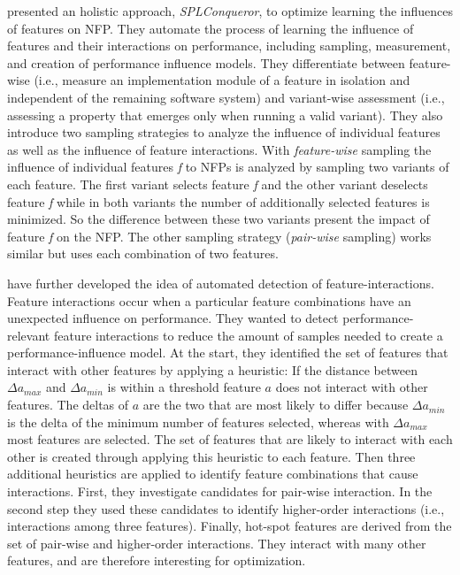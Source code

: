 \cite{siegmund2012spl} presented an holistic approach, \textit{SPLConqueror}, to optimize learning the influences of features on \ac{NFP}. They automate the process of learning the influence of features and their interactions on performance, including sampling, measurement, and creation of performance influence models. They differentiate between feature-wise (i.e., measure an implementation module of a feature in isolation and independent of the remaining software system) and variant-wise assessment (i.e., assessing a property that emerges only when running a valid variant). They also introduce two sampling strategies to analyze the influence of individual features as well as the influence of feature interactions. With \textit{feature-wise} sampling the influence of individual features \textit{f} to \acp{NFP} is analyzed by sampling two variants of each feature. The first variant selects feature \textit{f} and the other variant deselects feature \textit{f} while in both variants the number of additionally selected features is minimized. So the difference between these two variants present the impact of feature \textit{f} on the \ac{NFP}. The other sampling strategy (\textit{pair-wise} sampling) works similar but uses each combination of two features.

\cite{siegmund2012predicting} have further developed the idea of automated detection of feature-interactions. Feature interactions occur when a particular feature combinations have an unexpected influence on performance. They wanted to detect performance-relevant feature interactions to reduce the amount of samples needed to create a performance-influence model. At the start, they identified the set of features that interact with other features by applying a heuristic: If the distance between $\Delta a_{max}$ and $\Delta a_{min}$ is within a threshold feature $a$ does not interact with other features. The deltas of $a$ are the two that are most likely to differ because $\Delta a_{min}$ is the delta of the minimum number of features selected, whereas with $\Delta a_{max}$ most features are selected. The set of features that are likely to interact with each other is created through applying this heuristic to each feature. Then three additional heuristics are applied to identify feature combinations that cause interactions. First, they investigate candidates for pair-wise interaction. In the second step they used these candidates to identify higher-order interactions (i.e., interactions among three features). Finally, hot-spot features are derived from the set of pair-wise and higher-order interactions. They interact with many other features, and are therefore interesting for optimization.

